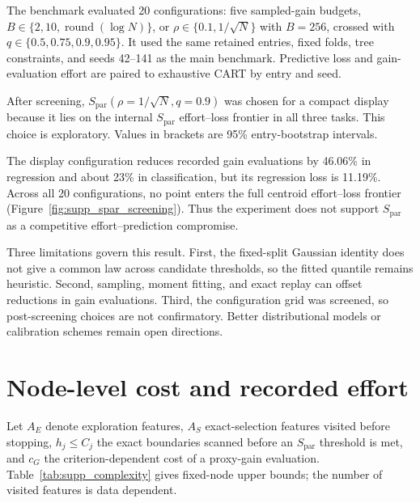 \documentclass[final,5p,times,twocolumn]{elsarticle}
\begin{document}
The benchmark evaluated 20 configurations: five sampled-gain
budgets, \(B\in\{2,10,\operatorname{round}(\log N)\}\), or
\(\rho\in\{0.1,1/\sqrt N\}\) with \(B=256\), crossed with
\(q\in\{0.5,0.75,0.9,0.95\}\).  It used the same retained entries, fixed folds,
tree constraints, and seeds 42--141 as the main benchmark.  Predictive loss
and gain-evaluation effort are paired to exhaustive CART by entry and seed.

After screening, \(S_{\mathrm{par}}(\rho=1/\sqrt N,q=0.9)\) was chosen for a
compact display because it lies on the internal \(S_{\mathrm{par}}\)
effort--loss frontier in all three tasks.  This choice is exploratory.  Values
in brackets are 95\% entry-bootstrap intervals.

\begin{center}
\small

\end{center}

The display configuration reduces recorded gain evaluations by 46.06\% in
regression and about 23\% in classification, but its regression loss is
11.19\%.  Across all 20 configurations, no point enters the full centroid
effort--loss frontier (Figure~\ref{fig:supp_spar_screening}).  Thus the
experiment does not support \(S_{\mathrm{par}}\) as a competitive
effort--prediction compromise.

Three limitations govern this result.  First, the fixed-split Gaussian identity
does not give a common law across candidate thresholds, so the fitted
quantile remains heuristic.  Second, sampling, moment fitting, and exact replay
can offset reductions in gain evaluations.  Third, the configuration grid was
screened, so post-screening choices are not confirmatory.  Better
distributional models or calibration schemes remain open directions.

\section{Node-level cost and recorded effort}
\label{sec:supp_complexity}

Let \(A_E\) denote exploration features, \(A_S\) exact-selection features
visited before stopping, \(h_j\leq C_j\) the exact boundaries scanned before an
\(S_{\mathrm{par}}\) threshold is met, and \(c_G\) the criterion-dependent cost
of a proxy-gain evaluation.  Table~\ref{tab:supp_complexity} gives fixed-node
upper bounds; the number of visited features is data dependent.
\end{document}
